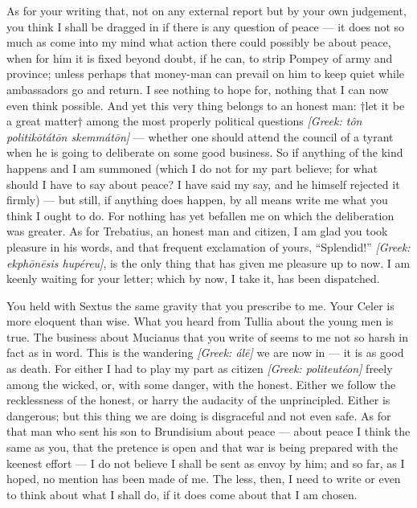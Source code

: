  As for your writing that, not on any external report but by your own judgement, you think I shall be dragged in if there is any question of peace --- it does not so much as come into my mind what action there could possibly be about peace, when for him it is fixed beyond doubt, if he can, to strip Pompey of army and province; unless perhaps that money-man can prevail on him to keep quiet while ambassadors go and return. I see nothing to hope for, nothing that I can now even think possible. And yet this very thing belongs to an honest man: †let it be a great matter† among the most properly political questions \textit{[Greek: t\^on politik\=ot\'at\=on skemm\'at\=on]} --- whether one should attend the council of a tyrant when he is going to deliberate on some good business. So if anything of the kind happens and I am summoned (which I do not for my part believe; for what should I have to say about peace? I have said my say, and he himself rejected it firmly) --- but still, if anything does happen, by all means write me what you think I ought to do. For nothing has yet befallen me on which the deliberation was greater. As for Trebatius, an honest man and citizen, I am glad you took pleasure in his words, and that frequent exclamation of yours, ``Splendid!'' \textit{[Greek: ekph\=on\=esis hup\'ereu]}, is the only thing that has given me pleasure up to now. I am keenly waiting for your letter; which by now, I take it, has been dispatched.

 You held with Sextus the same gravity that you prescribe to me. Your Celer is more eloquent than wise. What you heard from Tullia about the young men is true. The business about Mucianus that you write of seems to me not so harsh in fact as in word. This is the wandering \textit{[Greek: \'al\=e]} we are now in --- it is as good as death. For either I had to play my part as citizen \textit{[Greek: politeut\'eon]} freely among the wicked, or, with some danger, with the honest. Either we follow the recklessness of the honest, or harry the audacity of the unprincipled. Either is dangerous; but this thing we are doing is disgraceful and not even safe. As for that man who sent his son to Brundisium about peace --- about peace I think the same as you, that the pretence is open and that war is being prepared with the keenest effort --- I do not believe I shall be sent as envoy by him; and so far, as I hoped, no mention has been made of me. The less, then, I need to write or even to think about what I shall do, if it does come about that I am chosen.
